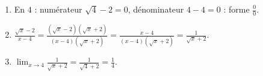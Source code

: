 \documentclass[11pt,a4paper]{article}
\begin{document}
\begin{correction}
\begin{enumerate}[label=\alph*),leftmargin=2em,itemsep=3pt]
  \item En $4$ : numérateur $\sqrt{4}-2=0$, dénominateur $4-4=0$ : forme $\frac00$.
  \item $\displaystyle\frac{\sqrt{x}-2}{x-4}=\frac{(\sqrt{x}-2)(\sqrt{x}+2)}{(x-4)(\sqrt{x}+2)}
        =\frac{x-4}{(x-4)(\sqrt{x}+2)}=\frac{1}{\sqrt{x}+2}$.
  \item $\displaystyle\lim_{x\to 4}\frac{1}{\sqrt{x}+2}=\frac{1}{\sqrt4+2}=\frac{1}{4}$.
\end{enumerate}
\end{correction}
\end{document}
